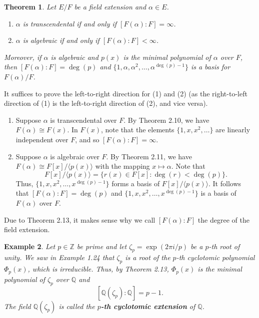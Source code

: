 \documentclass[10pt]{article}
\makeatletter
\newcommand{\Z}{\mathbb{Z}}
\newcommand{\Q}{\mathbb{Q}}
\theoremstyle{newstyle}
\newtheorem{thm}{Theorem}[section]
\newtheorem{exmp}[thm]{Example}
\newenvironment{pf}[1][\proofname]{\par
  \pushQED{\qed}%
  \normalfont \topsep0\p@\relax
  \trivlist
  \item[\hskip\labelsep\scshape
  #1\@addpunct{.}]\ignorespaces
}{%
  \popQED\endtrivlist\@endpefalse
}
\makeatother
\begin{document}
\begin{thm}
Let $E/F$ be a field extension and $\alpha \in E$.
\begin{enumerate}[(1)]
    \item $\alpha$ is transcendental if and only if $[F(\alpha) : F] = \infty$. 
    \item $\alpha$ is algebraic if and only if $[F(\alpha) : F] < \infty$.
\end{enumerate}
Moreover, if $\alpha$ is algebraic and $p(x)$ is the minimal polynomial of $\alpha$ over $F$, 
then $[F(\alpha) : F] = \deg(p)$ and $\{1, \alpha, \alpha^2, \dots, \alpha^{\deg(p)-1}\}$ is 
a basis for $F(\alpha)/F$. 
\end{thm}
\begin{pf}
It suffices to prove the left-to-right direction for (1) and (2) (as the right-to-left
direction of (1) is the left-to-right direction of (2), and vice versa).
\begin{enumerate}[(1)]
    \item Suppose $\alpha$ is transcendental over $F$. By Theorem 2.10, we have $F(\alpha) 
    \cong F(x)$. In $F(x)$, note that the elements $\{1, x, x^2, \dots\}$ are linearly 
    independent over $F$, and so $[F(\alpha) : F] = \infty$. 
    \item Suppose $\alpha$ is algebraic over $F$. By Theorem 2.11, we have 
    $F(\alpha) \cong F[x]/\langle p(x) \rangle$ with the mapping $x \mapsto \alpha$. 
    Note that 
    \[ F[x]/\langle p(x) \rangle = \{r(x) \in F[x] : \deg(r) < \deg(p)\}. \]
    Thus, $\{1, x, x^2, \dots, x^{\deg(p)-1}\}$ forms a basis of $F[x]/\langle p(x) \rangle$.
    It follows that $[F(\alpha) : F] = \deg(p)$ and $\{1, x, x^2, \dots, x^{\deg(p)-1}\}$ 
    is a basis of $F(\alpha)$ over $F$. \qedhere
\end{enumerate}
\end{pf}

Due to Theorem 2.13, it makes sense why we call $[F(\alpha) : F]$ the degree of the field extension.

\begin{exmp}
Let $p \in \Z$ be prime and let $\zeta_p = \exp(2\pi i/p)$ be a $p$-th root of unity. 
We saw in Example 1.24 that $\zeta_p$ is a root of the $p$-th cyclotomic polynomial 
$\Phi_p(x)$, which is irreducible. Thus, by Theorem 2.13, $\Phi_p(x)$ is the minimal polynomial 
of $\zeta_p$ over $\Q$ and 
\[ [\Q(\zeta_p) : \Q] = p-1. \]
The field $\Q(\zeta_p)$ is called the {\bf $p$-th cyclotomic extension} of $\Q$.
\end{exmp}
\end{document}
